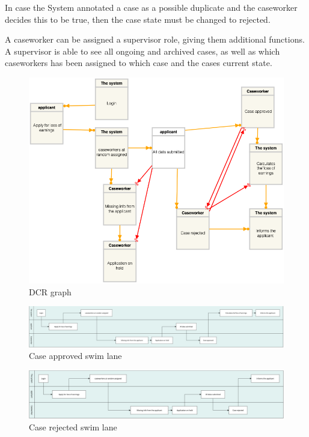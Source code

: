 \vspace{2mm}

In case the System annotated a case as a possible duplicate and the caseworker decides this to be true, then the case state must be changed to rejected.

\vspace{2mm}

A caseworker can be assigned a supervisor role, giving them additional functions. A supervisor is able to see all ongoing and archived cases, as well as which caseworkers has been assigned to which case and the cases current state.
\newpage
\begin{figure}[htb!]
	\includegraphics[width=\textwidth]{img/dcrgraph.png}
	\caption{DCR graph}
\end{figure}

\newpage
\begin{figure}[htb!]
    \centering
    \includegraphics[width=\textwidth]{img/swim-case-approved.png}
    \caption{Case approved swim lane}
\end{figure}

\begin{figure}[htb!]
    \centering
    \includegraphics[width=\textwidth]{img/swim-case-rejected.png}
    \caption{Case rejected swim lane}
\end{figure}
